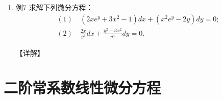 \documentclass[12pt, a4paper, oneside, UTF8]{ctexbook}
\begin{document}
\begin{remark}
\end{remark}

\begin{enumerate}[label=\arabic*.,start=7]
    \item 例7 求解下列微分方程：
    \begin{align*}
        (1)\ &(2xe^y+3x^2-1)dx+(x^2e^y-2y)dy=0; \\
        (2)\ &\frac{2x}{y^3}dx+\frac{y^2-3x^2}{y^4}dy=0.
    \end{align*}
    
    \begin{solution}
    【详解】
    \end{solution}
\end{enumerate}

\section{二阶常系数线性微分方程}
\end{document}
